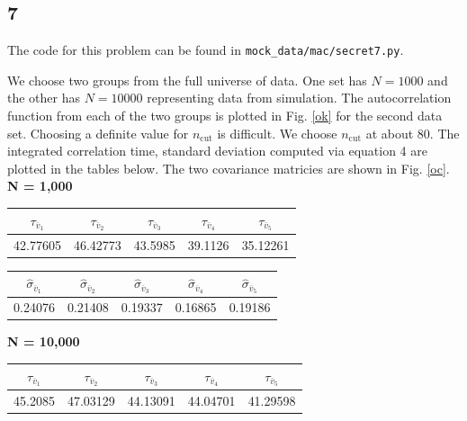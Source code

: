 \documentclass[singlepage,notitlepage,nofootinbib,11pt]{revtex4-1}
\begin{document}
\subsection{7}
\begin{center}The code for this problem can be found in \verb|mock_data/mac/secret7.py|. \end{center}
We choose two groups from the full universe of data. One set has $N=1000$ and the other has $N=10000$ representing data from simulation. The autocorrelation function from each of the two groups is plotted in Fig. \ref{ok} for the second data set. Choosing a definite value for $n_{\text{cut}}$ is difficult. We choose $n_{\text{cut}}$ at about 80. The integrated correlation time, standard deviation computed via equation 4 are plotted in the tables below. The two covariance matricies are shown in Fig. \ref{oc}.\\
{\bf N = 1,000}
\begin{center}
\begin{tabular}{ | c | c | c | c | c |}\hline
  $\tau_{\overline{v}_1}$ &  $\tau_{\overline{v}_2}$ &  $\tau_{\overline{v}_3}$ &  $\tau_{\overline{v}_4}$ &  $\tau_{\overline{v}_5}$  \\ \hline \hline 
  42.77605 & 46.42773 & 43.5985 & 39.1126 & 35.12261  \\ \hline
\end{tabular}
\end{center}
\begin{center}
\begin{tabular}{ | c | c | c | c | c |}\hline
  $\hat{\sigma}_{\overline{v}_1}$ &  $\hat{\sigma}_{\overline{v}_2}$ &  $\hat{\sigma}_{\overline{v}_3}$ &  $\hat{\sigma}_{\overline{v}_4}$ &  $\hat{\sigma}_{\overline{v}_5}$  \\ \hline \hline 
  0.24076 & 0.21408 & 0.19337 & 0.16865 & 0.19186 \\ \hline
\end{tabular}
\end{center}
{\bf N = 10,000}
\begin{center}
\begin{tabular}{ | c | c | c | c | c |}\hline
  $\tau_{\overline{v}_1}$ &  $\tau_{\overline{v}_2}$ &  $\tau_{\overline{v}_3}$ &  $\tau_{\overline{v}_4}$ &  $\tau_{\overline{v}_5}$  \\ \hline \hline 
  45.2085 & 47.03129 & 44.13091 & 44.04701 & 41.29598 \\ \hline
\end{tabular}
\end{center}
\end{document}
